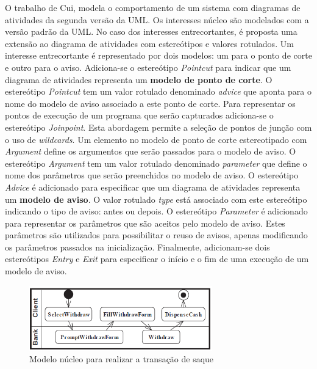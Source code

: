 O trabalho de Cui, \cite{Cui:2009:MIA:1529282.1529377} modela o comportamento de um sistema com diagramas de atividades da segunda versão da UML. Os
interesses núcleo são modelados com a versão padrão da UML. No caso dos interesses entrecortantes, é proposta uma extensão ao diagrama de atividades com
estereótipos e valores rotulados. Um interesse entrecortante é representado por dois modelos: um para o ponto de corte e outro para o aviso.
Adiciona-se o estereótipo \textit{Pointcut} para indicar que um diagrama de atividades representa um \textbf{modelo de ponto de corte}. O estereótipo
\textit{Pointcut} tem um valor rotulado denominado \textit{advice} que aponta para o nome do modelo de aviso associado a este ponto de corte. Para
representar os pontos de execução de um programa que serão capturados adiciona-se o estereótipo \textit{Joinpoint}. Esta abordagem permite a seleção
de pontos de junção com o uso de \textit{wildcards}. Um elemento no modelo de ponto de corte estereotipado com \textit{Argument} define os argumentos
que serão passados para o modelo de aviso. O estereótipo \textit{Argument} tem um valor rotulado denominado \textit{parameter} que define o nome dos
parâmetros que serão preenchidos no modelo de aviso. O estereótipo \textit{Advice} é adicionado para especificar que um diagrama de atividades
representa um \textbf{modelo de aviso}. O valor rotulado \textit{type} está associado com este estereótipo indicando o tipo de aviso: antes ou depois.
O estereótipo \textit{Parameter} é adicionado para representar os parâmetros que são aceitos pelo modelo de aviso. Estes parâmetros são utilizados
para possibilitar o reuso de avisos, apenas modificando os parâmetros passados na inicialização. Finalmente, adicionam-se dois estereótipos
\textit{Entry} e \textit{Exit} para especificar o início e o fim de uma execução de um modelo de aviso.
 
\begin{figure}
	\centering
	\includegraphics[width=300px]{img/withdraw_base.png}
	\caption{Modelo núcleo para realizar a transação de saque}\label{fig:withdraw_base}
\end{figure}

